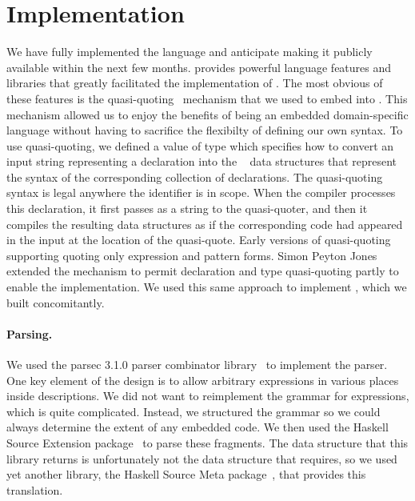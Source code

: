 \section{Implementation}
\label{sec:implementation}
We have fully implemented the \forest{} language and anticipate making
it publicly available within the next few months.
\haskell{} provides powerful language features and libraries that
greatly facilitated the implementation of \forest{}.  The most obvious
of these features is the quasi-quoting~\cite{Mainland:quasi} mechanism
that we used to embed \forest{} into \haskell{}.  This mechanism
allowed us to enjoy the benefits of being an embedded domain-specific
language without having to sacrifice the flexibilty of
defining our own syntax. To use quasi-quoting, we defined a \haskell{}
value  of type  which specifies how to
convert an input string representing a \forest{} declaration into the
\template{}~\cite{Sheard+:templatehaskell} 
data structures that represent the syntax of the
corresponding collection of \haskell{} declarations.
The quasi-quoting syntax 
is legal anywhere the identifier  is in scope.
When the \haskell{} compiler processes this declaration, it first
passes  as a string to the  quasi-quoter, and
then it compiles the resulting \template{} data structures as if the
corresponding \haskell{} code had appeared in the input at the
location of the quasi-quote.  Early versions of quasi-quoting
supporting quoting only expression and pattern forms.  Simon Peyton
Jones extended the mechanism to permit declaration and type
quasi-quoting partly to enable the \forest{} implementation.  We used
this same approach to implement \padshaskell{}, which we built
concomitantly. 

\paragraph{Parsing.}  
We used the parsec 3.1.0 parser
combinator library~\cite{LeijenMeijer:parsec} to implement the \forest{} parser.  One key element
of the \forest{} design is to allow arbitrary \haskell{} expressions
in various places inside \forest{} descriptions.  We did not want to
reimplement the grammar for \haskell{} expressions, which is quite
complicated.  Instead, we structured the \forest{} grammar so we could
always determine the extent of any embedded \haskell{} code.  We then
used the Haskell Source Extension package~\cite{haskell-src-exts} to parse
these fragments.  The data structure that this library returns is
unfortunately not the data structure that \template{} requires, so we
used yet another library, the Haskell Source Meta
package~\cite{haskell-src-meta}, that provides this translation. 


